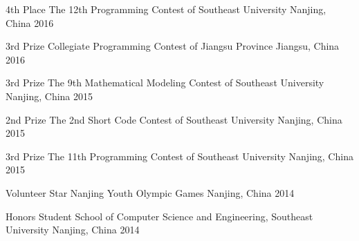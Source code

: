 
\begin{cvhonors}


  \cvhonor
    {4th Place} %
    {The 12th Programming Contest of Southeast University} %
    {Nanjing, China} %
    {2016} %

  \cvhonor
    {3rd Prize} %
    {Collegiate Programming Contest of Jiangsu Province} %
    {Jiangsu, China} %
    {2016} %

  \cvhonor
    {3rd Prize} %
    {The 9th Mathematical Modeling Contest of Southeast University} %
    {Nanjing, China} %
    {2015} %

  \cvhonor
    {2nd Prize} %
    {The 2nd Short Code Contest of Southeast University} %
    {Nanjing, China} %
    {2015} %

  \cvhonor
    {3rd Prize} %
    {The 11th Programming Contest of Southeast University} %
    {Nanjing, China} %
    {2015} %

  \cvhonor
    {Volunteer Star} %
    {Nanjing Youth Olympic Games} %
    {Nanjing, China} %
    {2014} %
                
  \cvhonor
    {Honors Student} %
    {School of Computer Science and Engineering, Southeast University} %
    {Nanjing, China} %
    {2014} %















\end{cvhonors}
